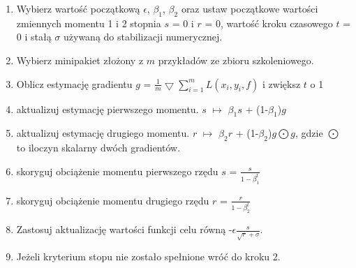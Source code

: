 \begin{enumerate}
	\item Wybierz wartość początkową $\epsilon$, $\beta_1$, $\beta_2$ oraz ustaw początkowe wartości zmiennych momentu 1 i 2 stopnia $s$ = 0 i $r$ = 0, wartość kroku czasowego $t$ = 0 i stałą $\sigma$ używaną do stabilizacji numerycznej.
	\item Wybierz minipakiet złożony z $m$ przykładów ze zbioru szkoleniowego.
	\item Oblicz estymację gradientu $g$ = $\frac{1}{m}\bigtriangledown \sum_{i=1}^{m}L(x_i, y_i, f)$ i zwiększ $t$ o 1
	\item aktualizuj estymację pierwszego momentu. $s$ $\mapsto$ $\beta_1$$s$ + (1-$\beta_1$)$g$
	\item aktualizuj estymację drugiego momentu. $r$ $\mapsto$ $\beta_2$$r$ + (1-$\beta_2$)$g\bigodot g$, gdzie $\bigodot$ to iloczyn skalarny dwóch gradientów.
	\item skoryguj obciążenie momentu pierwszego rzędu $s$ = $\frac{s}{1-\beta_1^t}$
	\item skoryguj obciążenie momentu drugiego rzędu $r$ = $\frac{r}{1-\beta_2^t}$
	\item Zastosuj aktualizację wartości funkcji celu równą -$\epsilon$$\frac{s}{\sqrt{r}+\sigma}$.
	\item Jeżeli kryterium stopu nie zostało spełnione wróć do kroku 2. 
\end{enumerate}

